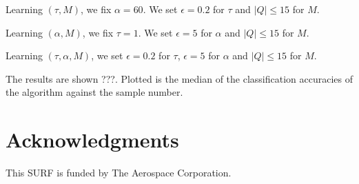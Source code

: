 \documentclass{siamart1116}
\begin{document}
    Learning $(\tau, M)$, we fix $\alpha=60$. We set $\epsilon=0.2$ for $\tau$ and $|Q| \le 15$ for $M$.

    Learning $(\alpha, M)$, we fix $\tau=1$. We set $\epsilon=5$ for $\alpha$ and $|Q| \le 15$ for $M$.

    Learning $(\tau, \alpha, M)$, we set $\epsilon=0.2$ for $\tau$, $\epsilon=5$ for $\alpha$ and $|Q| \le 15$ for $M$.

    The results are shown ???. Plotted is the median of the classification accuracies of the algorithm against the sample number.

\section{Acknowledgments}
    This SURF is funded by The Aerospace Corporation.



\end{document}
